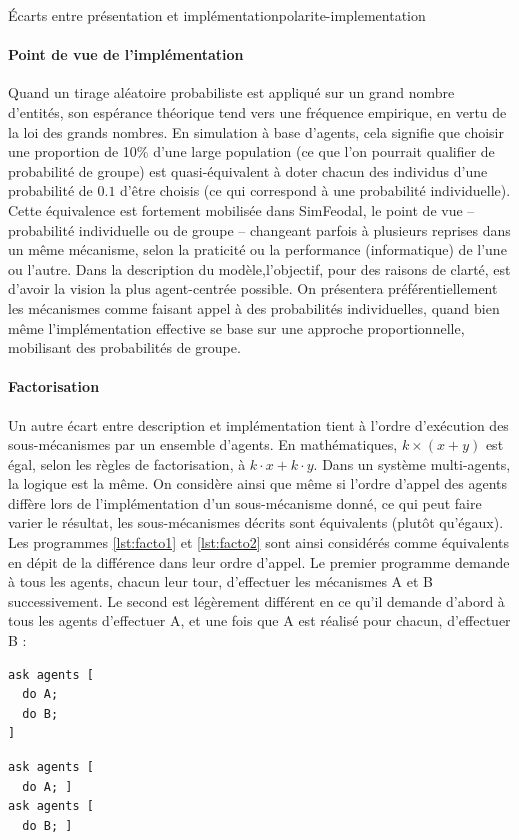 \begin{encadre}{Écarts entre présentation et implémentation}{polarite-implementation}
\paragraph{Point de vue de l'implémentation} Quand un tirage aléatoire probabiliste est appliqué sur un grand nombre d'entités, son espérance théorique tend vers une fréquence empirique, en vertu de la loi des grands nombres.
En simulation à base d'agents, cela signifie que choisir une proportion de 10\% d'une large population (ce que l'on pourrait qualifier de \og probabilité de groupe\fg{}) est quasi-équivalent à doter chacun des individus d'une probabilité de $0.1$ d'être choisis (ce qui correspond à une \og probabilité individuelle\fg{}).
Cette équivalence est fortement mobilisée dans SimFeodal, le \og point de vue\fg{} -- probabilité individuelle ou de groupe -- changeant parfois à plusieurs reprises dans un même mécanisme, selon la praticité ou la performance (informatique) de l'une ou l'autre.
Dans la description du modèle,l'objectif, pour des raisons de clarté, est d'avoir la vision la plus \og agent-centrée\fg{} possible.
On présentera préférentiellement les mécanismes comme faisant appel à des probabilités individuelles, quand bien même l'implémentation effective se base sur une approche proportionnelle, mobilisant des probabilités de groupe.

\paragraph{Factorisation} Un autre écart entre description et implémentation tient à l'ordre d'exécution des sous-mécanismes par un ensemble d'agents.
En mathématiques, $k\times (x+y)$ est égal, selon les règles de factorisation, à $k{\cdot}x + k{\cdot}y$.
Dans un système multi-agents, la logique est la même.
On considère ainsi que même si l'ordre d'appel des agents diffère lors de l'implémentation d'un sous-mécanisme donné, ce qui peut faire varier le résultat, les sous-mécanismes décrits sont équivalents (plutôt qu'égaux).
Les programmes \ref{lst:facto1} et \ref{lst:facto2} sont ainsi considérés comme équivalents en dépit de la différence dans leur ordre d'appel.
Le premier programme demande à tous les agents, chacun leur tour, d'effectuer les mécanismes A et B successivement.
Le second est légèrement différent en ce qu'il demande d'abord à tous les agents d'effectuer A, et une fois que A est réalisé pour chacun, d'effectuer B : \bigskip

\noindent\begin{minipage}[b]{.45\textwidth}
	\begin{lstlisting}[caption={Factorisé},frame=tlrb, captionpos=b, label = {lst:facto1}]
ask agents [
  do A;
  do B;
]
	\end{lstlisting}
\end{minipage}\hfill
\begin{minipage}[b]{.45\textwidth}
	\begin{lstlisting}[caption={Développé},frame=tlrb, captionpos=b, label = {lst:facto2}]
ask agents [
  do A; ]
ask agents [
  do B; ]
	\end{lstlisting}
\end{minipage}


\end{encadre}
